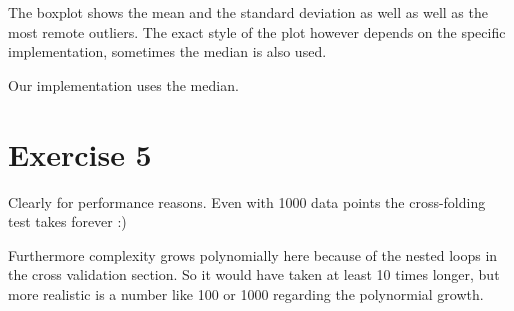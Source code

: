 \documentclass[a4paper,10pt]{article}
\begin{document}
The boxplot shows the mean and the standard deviation as well as well as the most remote outliers. The exact style of the plot however depends on the specific implementation, sometimes the median is also used.

Our implementation uses the median.

\section*{Exercise 5}

Clearly for performance reasons. Even with 1000 data points the cross-folding test takes forever :)

Furthermore complexity grows polynomially here because of the nested loops in the cross validation section. So it would have taken at least 10 times longer, but more realistic is a number like 100 or 1000 regarding the polynormial growth.
\end{document}
